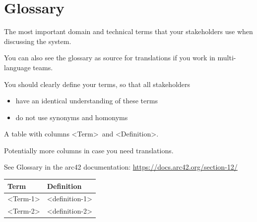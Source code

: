 \section{Glossary}

The most important domain and technical terms that your stakeholders use when discussing the system.

You can also see the glossary as source for translations if you work in multi-language teams.

You should clearly define your terms, so that all stakeholders
\begin{itemize}
  \item have an identical understanding of these terms
  \item do not use synonyms and homonyms
\end{itemize}

A table with columns \textless Term\textgreater\ and \textless Definition\textgreater.

Potentially more columns in case you need translations.

See Glossary in the arc42 documentation:
\href{https://docs.arc42.org/section-12/}{https://docs.arc42.org/section-12/}

\begin{longtable}{p{4cm} p{10cm}}
\toprule
Term & Definition \\
\midrule
\textless Term-1\textgreater & \textless definition-1\textgreater \\
\textless Term-2\textgreater & \textless definition-2\textgreater \\
\bottomrule
\end{longtable}

